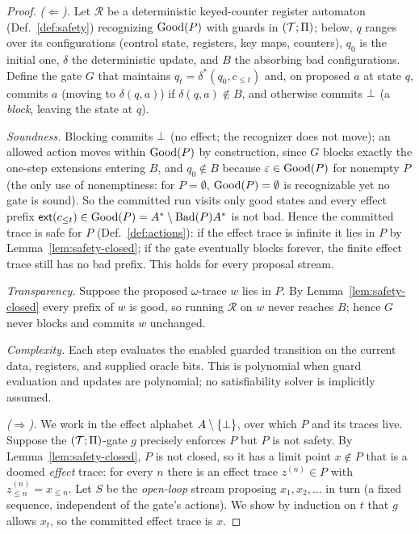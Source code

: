 \begin{proof}
\emph{($\Leftarrow$).} Let $\mathcal R$ be a deterministic keyed-counter register automaton
(Def.~\ref{def:safety}) recognizing $\mathrm{Good}(P)$ with guards in $(\mathcal{T};\Pi)$; below, $q$ ranges over its
configurations (control state, registers, key maps, counters), $q_0$ is the initial one, $\delta$ the
deterministic update, and $B$ the absorbing bad configurations. Define the gate $G$ that maintains
$q_t=\delta^{*}(q_0,c_{\le t})$ and, on
proposed $a$ at state $q$, commits $a$ (moving to $\delta(q,a)$) if
$\delta(q,a)\notin B$, and otherwise commits $\bot$ (a \emph{block}, leaving the
state at $q$).

\emph{Soundness.} Blocking commits $\bot$ (no effect; the recognizer does not move);
an allowed action moves within $\mathrm{Good}(P)$ by construction, since $G$ blocks exactly the
one-step extensions entering $B$, and $q_0\notin B$ because $\varepsilon\in\mathrm{Good}(P)$ for nonempty $P$ (the only use of nonemptiness: for $P=\emptyset$, $\mathrm{Good}(P)=\emptyset$ is recognizable yet no gate is sound). So the committed run visits only good states and every
effect prefix $\mathsf{ext}(c_{\le t})\in\mathrm{Good}(P)=A^{*}\setminus\mathrm{Bad}(P)A^{*}$ is not bad.
Hence the committed trace is safe for $P$ (Def.~\ref{def:actions}): if the effect trace is
infinite it lies in $P$ by Lemma~\ref{lem:safety-closed}; if the gate eventually blocks
forever, the finite effect trace still has no bad prefix. This holds for every proposal
stream.

\emph{Transparency.} Suppose the proposed $\omega$-trace $w$ lies in $P$. By
Lemma~\ref{lem:safety-closed} every prefix of $w$ is good, so running $\mathcal R$
on $w$ never reaches $B$; hence $G$ never blocks and commits $w$ unchanged.

\emph{Complexity.} Each step evaluates the enabled guarded transition on the
current data, registers, and supplied oracle bits. This is polynomial when
guard evaluation and updates are polynomial; no satisfiability solver is
implicitly assumed.

\emph{($\Rightarrow$).} We work in the effect alphabet $A\setminus\{\bot\}$, over which
$P$ and its traces live. Suppose the $(\mathcal{T};\Pi)$-gate $g$ precisely enforces $P$ but $P$ is not
safety. By Lemma~\ref{lem:safety-closed}, $P$ is not closed, so it has a limit point
$x\notin P$ that is a doomed \emph{effect} trace: for every $n$ there is an effect trace
$z^{(n)}\in P$ with $z^{(n)}_{\le n}=x_{\le n}$. Let $S$ be the \emph{open-loop} stream
proposing $x_1,x_2,\dots$ in turn (a fixed sequence, independent of the gate's actions). We
show by induction on $t$ that $g$ allows $x_t$, so the committed effect trace is $x$.


\end{proof}
